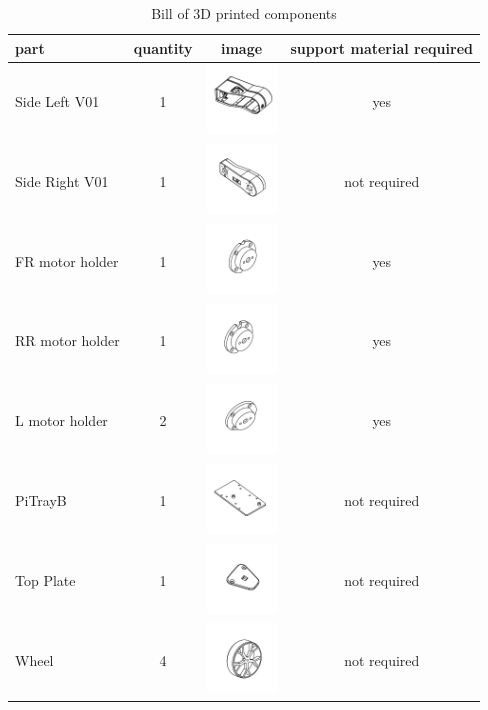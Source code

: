 \documentclass[12pt,titlepage,oneside]{memoir}
\begin{document}
\begin{table}
\begin{tabular}{p{5cm} | c | c | c}
part & quantity & image & support material required\\
\hline
Side Left V01 & 1 & \includegraphics[width=70px]{diagram/Side_Left_V01.pdf} & yes\\
Side Right V01 & 1 & \includegraphics[width=70px]{diagram/Side_Right_V01.pdf} & not required\\
FR motor holder & 1 & \includegraphics[width=70px]{diagram/FR_motor_holder.pdf} & yes\\
RR motor holder & 1 & \includegraphics[width=70px]{diagram/RR_motor_holder.pdf} & yes\\
L motor holder & 2 & \includegraphics[width=70px]{diagram/L_motor_holder.pdf} & yes\\
PiTrayB & 1 & \includegraphics[width=70px]{diagram/PiTrayB.pdf} & not required\\
Top Plate & 1 & \includegraphics[width=70px]{diagram/Top_Plate.pdf} & not required\\
Wheel & 4 & \includegraphics[width=70px]{diagram/Wheel.pdf} & not required
\end{tabular}
\caption{Bill of 3D printed components}
\label{table:3Dprintparts}
\end{table}
\end{document}
